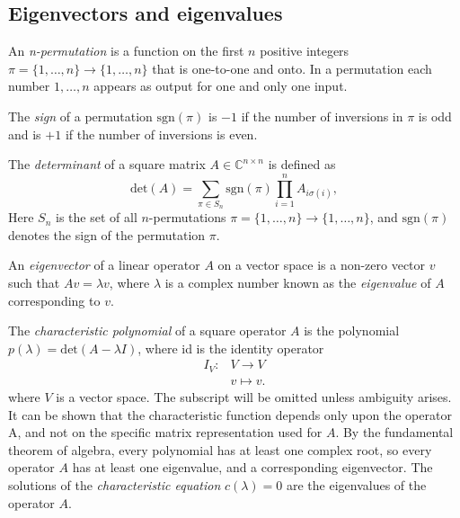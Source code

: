 \subsection{Eigenvectors and  eigenvalues}

\begin{definition}
  An \emph{n-permutation} is a function on the first $n$ positive integers  $\pi = \{1,\ldots,n\} \rightarrow  \{1,\ldots,n\} $ that is one-to-one and onto. In a permutation each number $1,\dots, n$ appears as output for one and only one input.
\end{definition}

\begin{definition}
  The \emph{sign} of a permutation $\text{sgn}(\pi)$ is $-1$ if the number of
inversions in $\pi$ is odd and is $+1$ if the number of inversions is even.
\end{definition}


\begin{definition}
  The \emph{determinant} of a square matrix $A \in \mathbb{C}^{n\times n}$ is defined as
  \begin{equation*}
    \text{det}(A) = \sum_{\pi \in S_n} \text{sgn}(\pi) \prod_{i=1}^{n} A_{i\sigma(i)},
  \end{equation*}
  Here $S_n$ is the set of all $n$-permutations $\pi = \{1,\ldots,n\} \rightarrow  \{1,\ldots,n\} $, and $\text{sgn}(\pi) $  denotes the sign of the permutation $\pi$.
\end{definition}

\begin{definition}
An \emph{eigenvector} of a linear operator $A$ on a vector space is a non-zero vector $v$ such that $A v  = \lambda v $, where $\lambda$ is a complex number known as the \emph{eigenvalue} of $A$ corresponding to $v$.
\end{definition}

The \emph{characteristic polynomial} of a square operator $A$ is the polynomial $p(\lambda) = \text{det}(A - \lambda I)$, where \gls{id} is the identity operator 
\begin{align*}
  I_V: & V \rightarrow V \\
  & v \mapsto v.
\end{align*}
where $V$ is a vector space.  The subscript will be omitted unless ambiguity arises. It can be shown that the characteristic
function depends only upon the operator A, and not on the specific matrix representation used for $A$. By the fundamental theorem of algebra, every polynomial has at least one complex root, so every operator $A$ has at least one eigenvalue, and a corresponding
eigenvector. The solutions of the \emph{characteristic equation} $c(\lambda) = 0$ are the eigenvalues of the operator $A$. %

